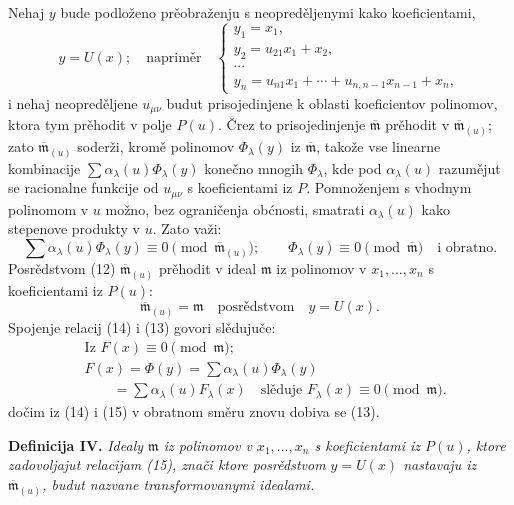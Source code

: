 \documentclass[11pt]{article}
\providecommand{\mideal}{\mathfrak m}
\providecommand{\zero}[1]{\equiv 0\pmod{#1}}
\begin{document}
Nehaj $y$ bude podloženo prěobraženju s neopreděljenymi kako koeficientami,
\begin{equation}
 y=U(x);\quad \text{napriměr}\quad
 \begin{cases}
 y_1=x_1,\\
 y_2=u_{21}x_1+x_2,\\
 \cdots\\
 y_n=u_{n1}x_1+\cdots+u_{n,n-1}x_{n-1}+x_n,
 \end{cases}
\tag{12}
\end{equation}
i nehaj neopreděljene $u_{\mu\nu}$ budut prisojedinjene k oblasti koeficientov polinomov, ktora tym prěhodit v polje $P(u)$. Črez to prisojedinjenje $\overline{\mideal}$ prěhodit v $\overline{\mideal}_{(u)}$; zato $\overline{\mideal}_{(u)}$ soderži, kromě polinomov $\Phi_\lambda(y)$ iz $\overline{\mideal}$, takože vse linearne kombinacije $\sum \alpha_\lambda(u)\Phi_\lambda(y)$ konečno mnogih $\Phi_\lambda$, kde pod $\alpha_\lambda(u)$ razumějut se racionalne funkcije od $u_{\mu\nu}$ s koeficientami iz $P$. Pomnoženjem s vhodnym polinomom v $u$ možno, bez ograničenja obćnosti, smatrati $\alpha_\lambda(u)$ kako stepenove produkty v $u$. Zato važi:
\begin{equation}
 \sum \alpha_\lambda(u)\Phi_\lambda(y)\zero{\overline{\mideal}_{(u)}};
 \qquad
 \Phi_\lambda(y)\zero{\overline{\mideal}}\quad\text{i obratno}.
\tag{13}
\end{equation}
Posrědstvom (12) $\overline{\mideal}_{(u)}$ prěhodit v ideal $\mideal$ iz polinomov v $x_1,\ldots,x_n$ s koeficientami iz $P(u)$:
\begin{equation}
 \overline{\mideal}_{(u)}=\mideal\quad \text{posrědstvom}\quad y=U(x).
\tag{14}
\end{equation}
Spojenje relacij (14) i (13) govori slědujuče:
\begin{equation}
\begin{aligned}
 &\text{Iz } F(x)\zero{\mideal};\\
 &F(x)=\Phi(y)=\sum \alpha_\lambda(u)\Phi_\lambda(y)\\
 &\hspace{2em}=\sum \alpha_\lambda(u)F_\lambda(x)
 \quad\text{slěduje } F_\lambda(x)\zero{\mideal}.
\end{aligned}
\tag{15}
\end{equation}
dočim iz (14) i (15) v obratnom směru znovu dobiva se (13).

\medskip
\noindent\textbf{Definicija IV.} {\itshape Idealy $\mideal$ iz polinomov v $x_1,\ldots,x_n$ s koeficientami iz $P(u)$, ktore zadovoljajut relacijam (15), znači ktore posrědstvom $y=U(x)$ nastavaju iz $\overline{\mideal}_{(u)}$, budut nazvane transformovanymi idealami.}
\end{document}
